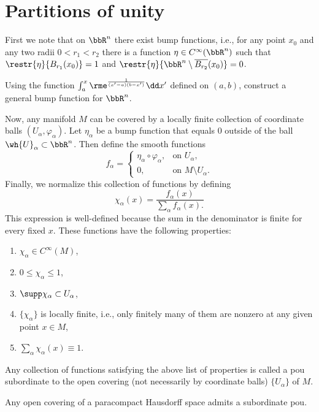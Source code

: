 \section{Partitions of unity}

First we note that on $\bbR^n$ there exist bump functions, i.e., for any point $x_0$ and any two radii $0<r_1<r_2$ there is a function $\eta\in C^\infty(\bbR^n)$ such that $\restr{\eta}{B_{r_1}(x_0)}=1$ and $\restr{\eta}{\bbR^n\setminus \overline{B_{r_2}}(x_0)}=0$.
\begin{xca}
    Using the function $\int_a^x \rme^{\frac{1}{(x'-a)(b-x')}} \dd x'$ defined on $(a,b)$, construct a general bump function for $\bbR^n$.
\end{xca}

Now, any manifold $M$ can be covered by a locally finite collection of coordinate balls $(U_\alpha,\varphi_\alpha)$. Let $\eta_\alpha$ be a bump function that equals $0$ outside of the ball $\wh{U}_\alpha\subset \bbR^n$. Then define the smooth functions
\[f_\alpha =\begin{cases} \eta_\alpha\circ\varphi_\alpha, & \text{on }U_\alpha, \\ 0, & \text{on }M\setminus U_\alpha.\end{cases}\]
Finally, we normalize this collection of functions by defining
\[\chi_\alpha(x)=\frac{f_\alpha(x)}{\sum_\alpha f_\alpha (x).}\]
This expression is well-defined because the sum in the denominator is finite for every fixed $x$. These functions have the following properties:
\begin{enumerate}
    \item $\chi_\alpha\in C^\infty(M)$,
    \item $0\leq \chi_\alpha\leq 1$,
    \item $\supp \chi_\alpha\subset U_\alpha$,
    \item $\{\chi_\alpha\}$ is locally finite, i.e., only finitely many of them are nonzero at any given point $x\in M$,
    \item $\sum_\alpha \chi_\alpha (x)\equiv 1$.
\end{enumerate}

\begin{defn}
    Any collection of functions satisfying the above list of properties is called a \gls{pou} subordinate to the open covering (not necessarily by coordinate balls) $\{U_\alpha\}$ of $M$.
\end{defn}

\begin{prop}
    Any open covering of a paracompact Hausdorff space admits a subordinate \gls{pou}.
\end{prop}

